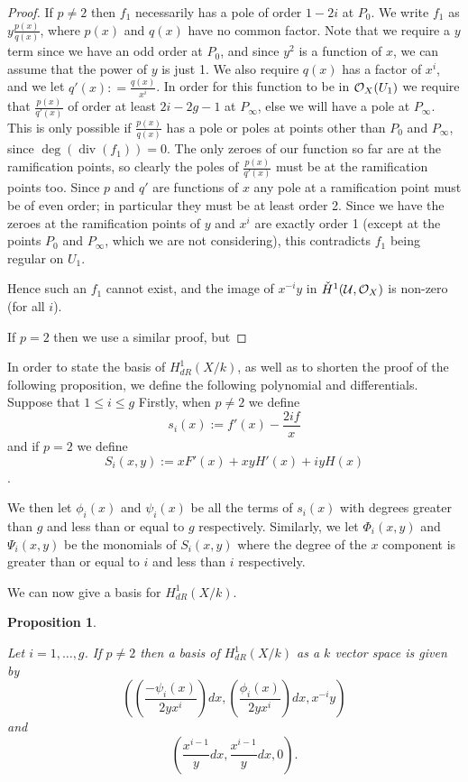 \documentclass[draft, 11pt]{article} %
\theoremstyle{plain}
\newtheorem{prop}[defn]{Proposition}
\theoremstyle{remark}
\newcommand{\cO}{{\cal O}}
\newcommand{\cU}{{\mathcal U}}
\DeclareMathOperator{\di}{div}
\begin{document}
{\begin{proof}
If $p \neq 2$ then $f_1$ necessarily has a pole of order $1-2i$ at $P_0$.
We write $f_1$ as $y \frac{p(x)}{q(x)}$, where $p(x)$ and $q(x)$ have no common factor.
Note that we require a $y$ term since we have an odd order at $P_0$, and since $y^2$ is a function of $x$, we can assume that the power of $y$ is just 1.
We also require $q(x)$ has a factor of $x^i$, and we let $q'(x) : = \frac{q(x)}{x^i}$.
In order for this function to be in $\cO_X(U_1)$ we require that $\frac{p(x)}{q'(x)}$ of order at least $2i-2g-1$ at $P_\infty$, else we will have a pole at $P_\infty$.
This is only possible if $\frac{p(x)}{q(x)}$ has a pole or poles at points other than $P_0$ and $P_\infty$, since $\deg(\di(f_1)) = 0$.
The only zeroes of our function so far are at the ramification points, so clearly the poles of $\frac{p(x)}{q'(x)}$ must be at the ramification points too.
Since $p$ and $q'$ are functions of $x$ any pole at a ramification point must be of even order; in particular they must be at least order 2.
Since we have the zeroes at the ramification points of $y$ and $x^i$ are exactly order 1 (except at the points $P_0$ and $P_\infty$, which we are not considering), this contradicts $f_1$ being regular on $U_1$.

Hence such an $f_1$ cannot exist, and the image of $x^{-i}y$ in $\check{H}^1(\cU,\cO_X)$ is non-zero (for all $i$).


If $p=2$ then we use a similar proof, but 
\end{proof}


In order to state the basis of $H^1_{dR}(X/k)$, as well as to shorten the proof of the following proposition, we define the following polynomial and differentials.
Suppose that $1 \leq i \leq g$
Firstly, when $p\neq 2$ we define
\[
s_i(x) := f'(x) - \frac{2if}{x}
\]
and if $p = 2$ we define
\[
S_i(x,y) := xF'(x) + xyH'(x) + iyH(x)
\].

We then let $\phi_i(x)$ and $\psi_i(x)$ be all the terms of $s_i(x)$ with degrees greater than $g$ and less than or equal to $g$ respectively.
Similarly, we let $\Phi_i(x,y)$ and $\Psi_i(x,y)$ be the monomials of $S_i(x,y)$ where the degree of the $x$ component is greater than or equal to $i$ and less than $i$ respectively.

We can now give a basis for $H^1_{dR}(X/k)$.\\

\begin{prop}\label{basis}

Let $i=1,\ldots, g$. If $p\neq 2$ then a basis of $H^1_{dR}(X/k)$ as a $k$ vector space is given by
\begin{equation}\label{one}
 \left( \left( \frac{-\psi_i(x)}{2yx^i}\right) dx, \left(\frac{\phi_i(x)}{2yx^i}\right) dx, x^{-i}y\right)
\end{equation}
and
\begin{equation}\label{two}
 \left( \frac{x^{i-1}}{y} dx , \frac{x^{i-1}}{y} dx, 0 \right).
\end{equation}


\end{prop}}
\end{document}
